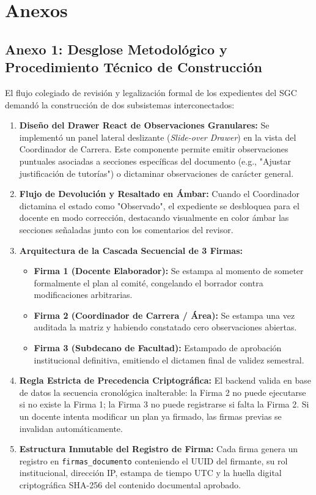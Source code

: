 \documentclass[12pt,a4paper]{article}
\begin{document}
\vspace{0.4cm}

\section{Anexos}

\subsection*{Anexo 1: Desglose Metodológico y Procedimiento Técnico de Construcción}
El flujo colegiado de revisión y legalización formal de los expedientes del SGC demandó la construcción de dos subsistemas interconectados:

\begin{enumerate}[leftmargin=1.5em, itemsep=3pt]
    \item \textbf{Diseño del Drawer React de Observaciones Granulares:} Se implementó un panel lateral deslizante (\textit{Slide-over Drawer}) en la vista del Coordinador de Carrera. Este componente permite emitir observaciones puntuales asociadas a secciones específicas del documento (e.g., "Ajustar justificación de tutorías") o dictaminar observaciones de carácter general.
    \item \textbf{Flujo de Devolución y Resaltado en Ámbar:} Cuando el Coordinador dictamina el estado como "Observado", el expediente se desbloquea para el docente en modo corrección, destacando visualmente en color ámbar las secciones señaladas junto con los comentarios del revisor.
    \item \textbf{Arquitectura de la Cascada Secuencial de 3 Firmas:}
    \begin{itemize}[leftmargin=1.2em, itemsep=2pt]
        \item \textbf{Firma 1 (Docente Elaborador):} Se estampa al momento de someter formalmente el plan al comité, congelando el borrador contra modificaciones arbitrarias.
        \item \textbf{Firma 2 (Coordinador de Carrera / Área):} Se estampa una vez auditada la matriz y habiendo constatado cero observaciones abiertas.
        \item \textbf{Firma 3 (Subdecano de Facultad):} Estampado de aprobación institucional definitiva, emitiendo el dictamen final de validez semestral.
    \end{itemize}
    \item \textbf{Regla Estricta de Precedencia Criptográfica:} El backend valida en base de datos la secuencia cronológica inalterable: la Firma 2 no puede ejecutarse si no existe la Firma 1; la Firma 3 no puede registrarse si falta la Firma 2. Si un docente intenta modificar un plan ya firmado, las firmas previas se invalidan automáticamente.
    \item \textbf{Estructura Inmutable del Registro de Firma:} Cada firma genera un registro en \texttt{firmas\_\allowbreak  documento} conteniendo el UUID del firmante, su rol institucional, dirección IP, estampa de tiempo UTC y la huella digital criptográfica SHA-256 del contenido documental aprobado.
\end{enumerate}
\end{document}
